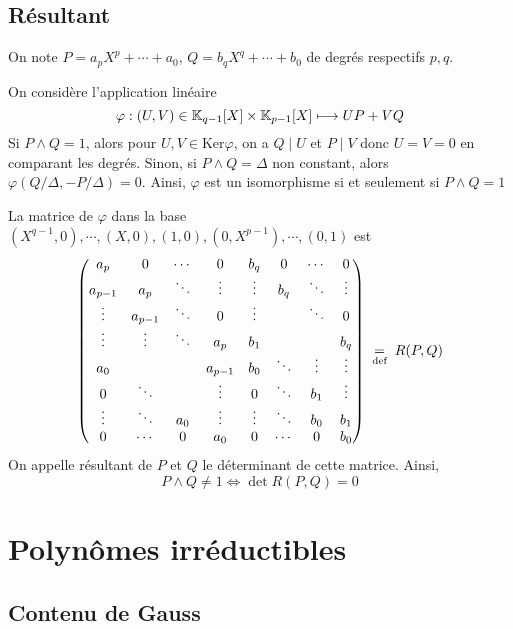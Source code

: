 \subsection{Résultant}


On note $P=a_pX^p+\cdots + a_0$, $Q=b_qX^q+\cdots + b_0$ de degrés respectifs $p, q$.

On considère l'application linéaire \[
    \varphi: (U, V)\in\mathbb K_{q-1}[X]\times \mathbb K_{p-1}[X]\longmapsto UP+VQ
\]
Si $P\land Q=1$, alors pour $U, V\in\mathrm{Ker}\varphi$, on a $Q\;|\;U$ et $P\;|\;V$ donc $U=V=0$ en comparant les degrés. Sinon, si $P\land Q=\Delta$ non constant, alors $\varphi(Q/\Delta, -P/\Delta)=0$. Ainsi, $\varphi$ est un isomorphisme si et seulement si $P\land Q=1$

La matrice de $\varphi$ dans la base $(X^{q-1}, 0), \cdots, (X, 0), (1, 0), (0, X^{p-1}), \cdots, (0, 1)$ est \[
\begin{pmatrix}a_{p}&0&\cdots &0&b_{q}&0&\cdots &0\\a_{p-1}&a_{p}&\ddots &\vdots &\vdots &b_{q}&\ddots &\vdots \\\vdots &a_{p-1}&\ddots &0&\vdots &&\ddots &0\\\vdots &\vdots &\ddots &a_{p}&b_{1}&&&b_{q}\\a_{0}&&&a_{p-1}&b_{0}&\ddots &\vdots &\vdots \\0&\ddots &&\vdots &0&\ddots &b_{1}&\vdots \\\vdots &\ddots &a_{0}&\vdots &\vdots &\ddots &b_{0}&b_{1}\\0&\cdots &0&a_{0}&0&\cdots &0&b_{0}\\\end{pmatrix}\;\underset{\text{def}}=\; R(P, Q)
\]
On appelle résultant de $P$ et $Q$ le déterminant de cette matrice. Ainsi, \[
    P\land Q\neq 1 \iff \det R(P, Q)=0
\]

\section{Polynômes irréductibles}


\subsection{Contenu de Gauss}


